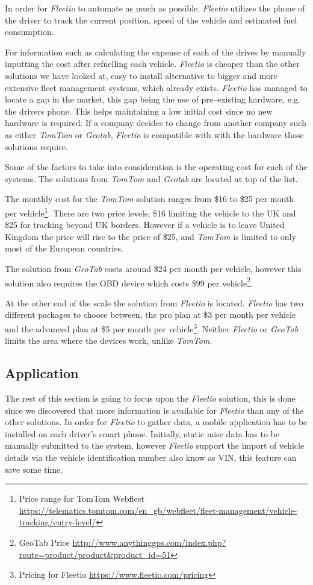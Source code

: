 In order for \textit{Fleetio} to automate as much as possible, \textit{Fleetio} utilizes the phone of the driver to track the current position, speed of the vehicle and estimated fuel consumption.

For information such as calculating the expense of each of the drives by manually inputting the cost after refuelling each vehicle.
\textit{Fleetio} is cheaper than the other solutions we have looked at, easy to install alternative to bigger and more extensive fleet management systems, which already exists.
\textit{Fleetio} has managed to locate a gap in the market, this gap being the use of pre--existing hardware, e.g. the drivers phone.
This helps maintaining a low initial cost since no new hardware is required.
If a company decides to change from another company such as either \textit{TomTom} or \textit{Geotab}, \textit{Fleetio} is compatible with with the hardware those solutions require.

Some of the factors to take into consideration is the operating cost for each of the systems.
The solutions from \textit{TomTom} and \textit{Geotab} are located at top of the list.

The monthly cost for the \textit{TomTom} solution ranges from \$16 to \$25 per month per vehicle\footnote{Price range for TomTom Webfleet\\ \url{https://telematics.tomtom.com/en_gb/webfleet/fleet-management/vehicle-tracking/entry-level/}}.
There are two price levels; \$16 limiting the vehicle to the UK and \$25 for tracking beyond UK borders.
However if a vehicle is to leave United Kingdom the price will rise to the price of \$25, and \textit{TomTom} is limited to only most of the European countries.

The solution from \textit{GeoTab} costs around \$24 per month per vehicle, however this solution also requires the OBD device which costs \$99 per vehicle\footnote{GeoTab Price \url{http://www.anythinggps.com/index.php?route=product/product&product_id=51}}.

At the other end of the scale the solution from \textit{Fleetio} is located.
\textit{Fleetio} has two different packages to choose between, the pro plan at \$3 per month per vehicle and the advanced plan at \$5 per month per vehicle\footnote{Pricing for Fleetio \url{https://www.fleetio.com/pricing}}.
Neither \textit{Fleetio} or \textit{GeoTab} limits the area where the devices work, unlike \textit{TomTom}.

\subsection{Application}\label{sub:Application}
The rest of this section is going to focus upon the \textit{Fleetio} solution, this is done since we discovered that more information is available for \textit{Fleetio} than any of the other solutions.
In order for \textit{Fleetio} to gather data, a mobile application has to be installed on each driver's smart phone.
Initially, static misc data has to be manually submitted to the system, however \textit{Fleetio} support the import of vehicle details via the vehicle identification number also know as VIN, this feature can save some time.

